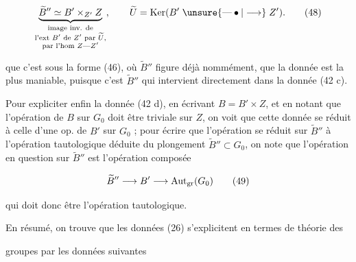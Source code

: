 \[
 \underbrace{\widetilde B''\simeq B'\times_{Z'}Z}_{\substack{\text{image inv. de}\\\text{l'ext $B'$ de $Z'$ par $\widetilde U$,}\\\text{par l'hom }Z\mathrel{\text{---}} Z'}},
 \qquad\widetilde U=\operatorname{Ker}(B'\mathrel{\unsure{\text{---}\bullet|\longrightarrow}} Z').\tag*{(48)}
\]

  que c'est sous la forme (46), où $\widetilde B''$ figure déjà nommément, que la donnée est  la plus maniable, puisque c'est  $\widetilde B''$ qui intervient directement dans la donnée (42 c).

 Pour expliciter enfin la donnée (42 d), en écrivant $B=B'\times Z$, et en notant que l'opération de $B$ sur $G_0$ doit être triviale sur $Z$, on voit que cette donnée se réduit à celle d'une op. de $B'$ sur $G_0$ ;  pour écrire que  l'opération  se réduit sur $\widetilde B''$ à l'opération tautologique déduite du plongement $\widetilde B''\subset G_0$, on note que l'opération en question sur $\widetilde B''$ est l'opération composée

\[ \widetilde B''\longrightarrow B'\longrightarrow\operatorname{Aut}_{\rm gr}(G_0) \tag*{(49)} \]

qui doit donc être l'opération tautologique.

En résumé, on trouve que les données (26) s'explicitent en termes de théorie des


groupes par les données suivantes


